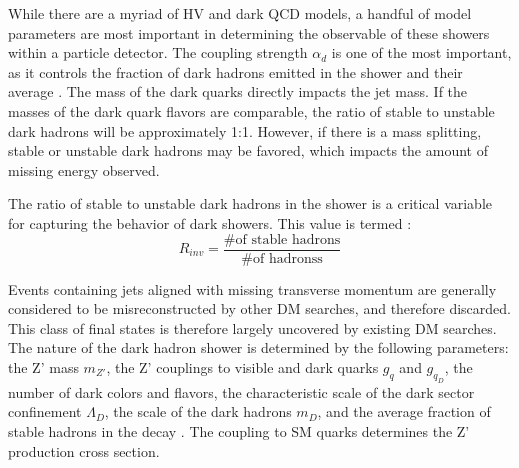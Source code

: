 While there are a myriad of HV and dark QCD models, a handful of model parameters are most important in determining the observable of these showers within a particle detector. The coupling strength $\alpha_d$ is one of the most important, as it controls the fraction of dark hadrons emitted in the shower and their average \pt. The mass of the dark quarks directly impacts the jet mass. If the masses of the dark quark flavors are comparable, the ratio of stable to unstable dark hadrons will be approximately 1:1. However, if there is a mass splitting, stable or unstable dark hadrons may be favored, which impacts the amount of missing energy observed. \par

The ratio of stable to unstable dark hadrons in the shower is a critical variable for capturing the behavior of dark showers. This value is termed \rinv:
\begin{equation}
	R_{inv} = \frac{\textrm{\# of stable hadrons}}{\textrm{\# of hadronss}}
\end{equation}

Events containing jets aligned with missing transverse momentum are generally considered to be misreconstructed by other DM searches, and therefore discarded. This class of final states is therefore largely uncovered by existing DM searches. The nature of the dark hadron shower is determined by the following parameters: the Z' mass $m_{Z'}$, the Z' couplings to visible and dark quarks $g_q$ and $g_{q_D}$, the number of dark colors and flavors, the characteristic scale of the dark sector confinement $\Lambda_D$, the scale of the dark hadrons $m_D$, and the average fraction of stable hadrons in the decay \rinv. The coupling to SM quarks determines the Z' production cross section.

